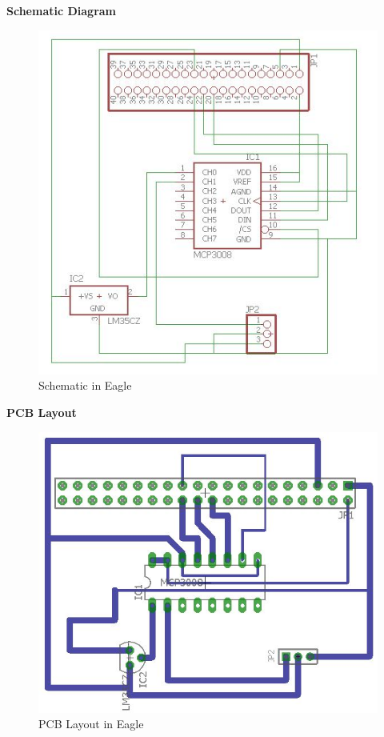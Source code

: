 \documentclass[a4paper,12pt,oneside]{book}
\begin{document}
\textbf{Schematic Diagram}\\
\begin{figure}[H]
    \centering
    \includegraphics[scale=0.4]{adc_schematic}
    \caption{Schematic in Eagle}
\end{figure}
\textbf{PCB Layout}\\
\begin{figure}[H]
    \centering
    \includegraphics[scale=0.4]{adc_layout}
    \caption{PCB Layout in Eagle}
\end{figure}
\end{document}
